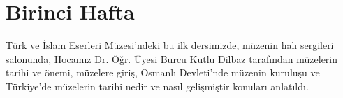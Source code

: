 \section{Birinci Hafta}
\indent\indent Türk ve İslam Eserleri Müzesi’ndeki bu ilk dersimizde, müzenin halı sergileri salonunda, Hocamız Dr. Öğr. Üyesi Burcu Kutlu Dilbaz tarafından müzelerin tarihi ve önemi, müzelere giriş, Osmanlı Devleti’nde müzenin kuruluşu ve Türkiye'de müzelerin tarihi nedir ve nasıl gelişmiştir konuları anlatıldı.





